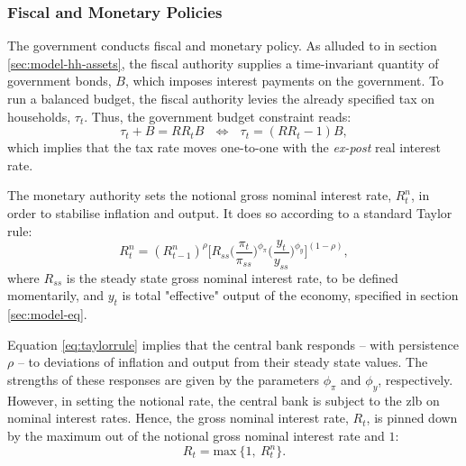\documentclass[12pt]{article} %
\numberwithin{equation}{section} %
\numberwithin{figure}{section}
\numberwithin{table}{section}
\begin{document}

\subsubsection{Fiscal and Monetary Policies}
\label{sec:model-policy}

The government conducts fiscal and monetary policy. As alluded to in section \ref{sec:model-hh-assets}, the fiscal authority supplies a time-invariant quantity of government bonds, $B$, which imposes interest payments on the government. To run a balanced budget, the fiscal authority levies the already specified tax on households, $\tau_t$. Thus, the government budget constraint reads:
\begin{equation}
    \tau_t + B = RR_t B \ \ \ \Leftrightarrow \ \ \ \tau_t = (RR_t - 1)B, \label{eq:fiscal-budget}
\end{equation}
which implies that the tax rate moves one-to-one with the \textit{ex-post} real interest rate.

The monetary authority sets the notional gross nominal interest rate, $R_{t}^n$, in order to stabilise inflation and output. It does so according to a standard Taylor rule:
\begin{equation}
    R_{t}^n = ( R_{t-1}^n )^{\rho} \Bigg[ R_{ss} \Bigg( \frac{\pi_t}{\pi_{ss}} \Bigg)^{\phi_{\pi}} \Bigg( \frac{y_t}{y_{ss}} \Bigg)^{\phi_y} \Bigg]^{(1-\rho)}, \label{eq:taylorrule}
\end{equation}
where $R_{ss}$ is the steady state gross nominal interest rate, to be defined momentarily, and $y_t$ is total "effective" output of the economy, specified in section \ref{sec:model-eq}.

Equation \eqref{eq:taylorrule} implies that the central bank responds -- with persistence $\rho$ -- to deviations of inflation and output from their steady state values. The strengths of these responses are given by the parameters $\phi_{\pi}$ and $\phi_y$, respectively. However, in setting the notional rate, the central bank is subject to the \Gls{zlb} on nominal interest rates. Hence, the gross nominal interest rate, $R_t$, is pinned down by the maximum out of the notional gross nominal interest rate and $1$: 
\begin{equation}
    R_t = \text{max} \ \{ 1, \ R_{t}^n \}. \label{eq:zlb}
\end{equation}
\end{document}
